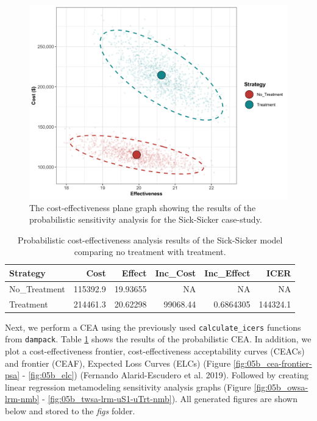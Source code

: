 \documentclass[]{article}
\begin{document}
\begin{figure}
\centering
\includegraphics{../figs/05b_cea-plane-scatter.png}
\caption{The cost-effectiveness plane graph showing the results of the
probabilistic sensitivity analysis for the Sick-Sicker case-study.
\label{fig:05b_CEAplane}}
\end{figure}

\begin{table}[t]

\caption{\label{tab:unnamed-chunk-21}Probabilistic cost-effectiveness analysis results of the Sick-Sicker model comparing no treatment with treatment. \label{tab:df.cea.prob}}
\centering
\begin{tabular}{l|r|r|r|r|r}
\hline
Strategy & Cost & Effect & Inc\_Cost & Inc\_Effect & ICER\\
\hline
No\_Treatment & 115392.9 & 19.93655 & NA & NA & NA\\
\hline
Treatment & 214461.3 & 20.62298 & 99068.44 & 0.6864305 & 144324.1\\
\hline
\end{tabular}
\end{table}

Next, we perform a CEA using the previously used
\texttt{calculate\_icers} functions from \texttt{dampack}. Table
\ref{tab:df.cea.prob} shows the results of the probabilistic CEA. In
addition, we plot a cost-effectiveness frontier, cost-effectiveness
acceptability curves (CEACs) and frontier (CEAF), Expected Loss Curves
(ELCs) (Figure \ref{fig:05b_cea-frontier-psa} - \ref{fig:05b_elc})
(Fernando Alarid-Escudero et al. 2019). Followed by creating linear
regression metamodeling sensitivity analysis graphs (Figure
\ref{fig:05b_owsa-lrm-nmb} - \ref{fig:05b_twsa-lrm-uS1-uTrt-nmb}). All
generated figures are shown below and stored to the \emph{figs} folder.
\end{document}
